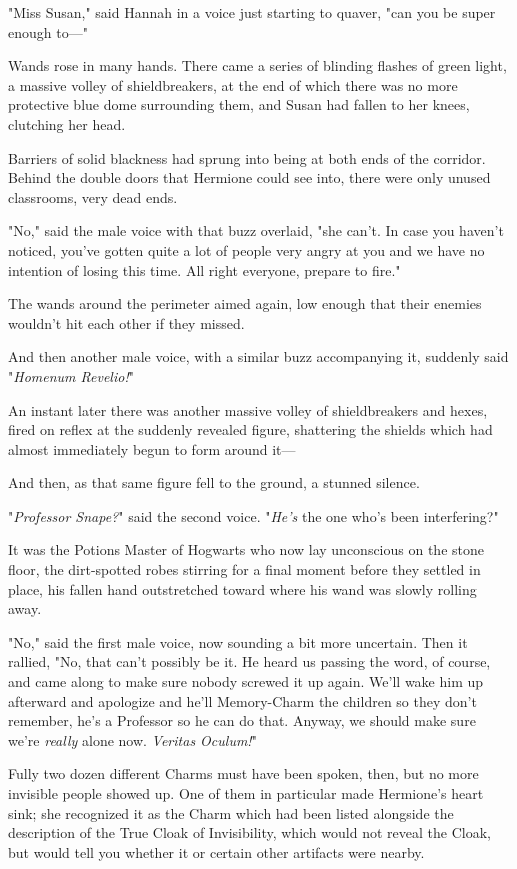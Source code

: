 "Miss Susan," said Hannah in a voice just starting to quaver, "can you be super
enough to—"

Wands rose in many hands. There came a series of blinding flashes of green
light, a massive volley of shieldbreakers, at the end of which there was no
more protective blue dome surrounding them, and Susan had fallen to her knees,
clutching her head.

Barriers of solid blackness had sprung into being at both ends of the corridor.
Behind the double doors that Hermione could see into, there were only unused
classrooms, very dead ends.

"No," said the male voice with that buzz overlaid, "she can't. In case you
haven't noticed, you've gotten quite a lot of people very angry at you and we
have no intention of losing this time. All right everyone, prepare to fire."

The wands around the perimeter aimed again, low enough that their enemies
wouldn't hit each other if they missed.

And then another male voice, with a similar buzz accompanying it, suddenly said
"\emph{Homenum Revelio!}"

An instant later there was another massive volley of shieldbreakers and hexes,
fired on reflex at the suddenly revealed figure, shattering the shields which
had almost immediately begun to form around it—

And then, as that same figure fell to the ground, a stunned silence.

"\emph{Professor Snape?}" said the second voice. "\emph{He's} the one who's
been interfering?"

It was the Potions Master of Hogwarts who now lay unconscious on the stone
floor, the dirt-spotted robes stirring for a final moment before they settled
in place, his fallen hand outstretched toward where his wand was slowly rolling
away.

"No," said the first male voice, now sounding a bit more uncertain. Then it
rallied, "No, that can't possibly be it. He heard us passing the word, of
course, and came along to make sure nobody screwed it up again. We'll wake him
up afterward and apologize and he'll Memory-Charm the children so they don't
remember, he's a Professor so he can do that. Anyway, we should make sure we're
\emph{really} alone now. \emph{Veritas Oculum!}"

Fully two dozen different Charms must have been spoken, then, but no more
invisible people showed up. One of them in particular made Hermione's heart
sink; she recognized it as the Charm which had been listed alongside the
description of the True Cloak of Invisibility, which would not reveal the
Cloak, but would tell you whether it or certain other artifacts were nearby.

